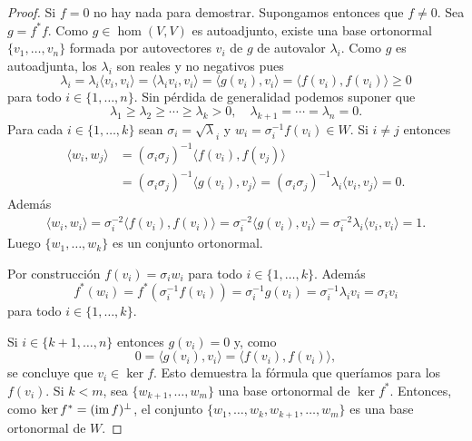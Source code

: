 \begin{thm}
    \begin{proof}
        Si $f=0$ no hay nada para demostrar. Supongamos entonces que $f\ne0$.
        Sea $g=f^*f$.  Como $g\in\hom(V,V)$ es autoadjunto, existe una base
        ortonormal $\{v_1,\dots,v_n\}$ formada por autovectores $v_i$ de $g$ de
        autovalor $\lambda_i$. Como $g$ es autoadjunta, los $\lambda_i$ son
        reales y no negativos pues 
        \[
            \lambda_i
            =\lambda_i\langle v_i,v_i\rangle
            =\langle \lambda_iv_i,v_i\rangle
            =\langle g(v_i),v_i\rangle
            =\langle f(v_i),f(v_i)\rangle\geq0
        \]
        para todo $i\in\{1,\dots,n\}$. Sin pérdida de generalidad podemos suponer que
        \[
            \lambda_1\geq\lambda_2\geq\cdots\geq\lambda_k>0,
            \quad
            \lambda_{k+1}=\cdots=\lambda_n=0.
        \]
        Para cada $i\in\{1,\dots,k\}$ sean $\sigma_i=\sqrt\lambda_i$ y
        $w_i=\sigma_i^{-1}f(v_i)\in W$. Si $i\ne j$ entonces 
        \begin{align*}
            \langle w_i,w_j\rangle
            &=(\sigma_i\sigma_j)^{-1}\langle f(v_i),f(v_j)\rangle\\
            &=(\sigma_i\sigma_j)^{-1}\langle g(v_i),v_j\rangle
            =(\sigma_i\sigma_j)^{-1}\lambda_i\langle v_i,v_j\rangle=0.
        \end{align*}
        Además 
        \begin{align*}
            \langle w_i,w_i\rangle
            =\sigma_i^{-2}\langle f(v_i),f(v_i)\rangle
            =\sigma_i^{-2}\langle g(v_i),v_i\rangle
            =\sigma_i^{-2}\lambda_i\langle v_i,v_i\rangle=1.
        \end{align*}
        Luego $\{w_1,\dots,w_k\}$ es un conjunto ortonormal. 

        Por construcción $f(v_i)=\sigma_iw_i$ para todo $i\in\{1,\dots,k\}$. Además 
        \[
        f^*(w_i)=f^*(\sigma_i^{-1}f(v_i))=\sigma_i^{-1}g(v_i)=\sigma_i^{-1}\lambda_iv_i=\sigma_iv_i
        \]
        para todo $i\in\{1,\dots,k\}$. 

        Si $i\in\{k+1,\dots,n\}$ entonces $g(v_i)=0$ y, como 
        \[
            0=\langle g(v_i),v_i\rangle=\langle f(v_i),f(v_i)\rangle,
        \]
        se concluye que $v_i\in\ker f$. Esto demuestra la fórmula que queríamos
        para los $f(v_i)$. Si $k<m$, sea $\{w_{k+1},\dots,w_m\}$ una base
        ortonormal de $\ker f^*$. Entonces, como $\ker f^*=(\operatorname{im} f)^\perp$, el
        conjunto $\{w_1,\dots,w_k,w_{k+1},\dots,w_m\}$ es una base ortonormal
        de $W$. 
    \end{proof}
\end{thm}

